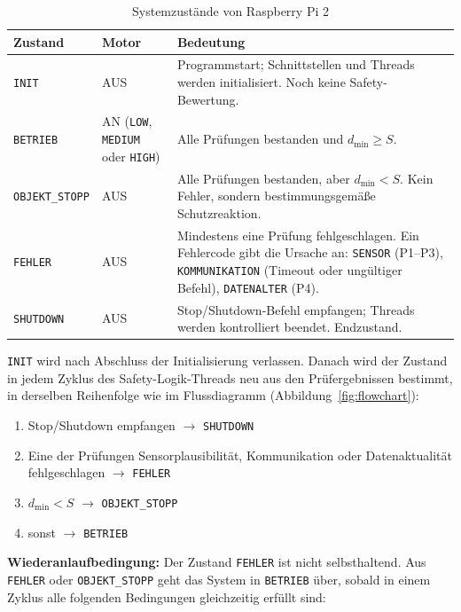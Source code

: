 \begin{table}[H]
    \centering
    \small
    \begin{tabularx}{\textwidth}{@{}p{2.7cm}p{2.2cm}Y@{}}
        \toprule
        \textbf{Zustand} & \textbf{Motor} & \textbf{Bedeutung} \\
        \midrule
        \texttt{INIT} & AUS & Programmstart; Schnittstellen und Threads werden initialisiert. Noch keine Safety-Bewertung. \\
        \texttt{BETRIEB} & AN (\texttt{LOW}, \texttt{MEDIUM} oder \texttt{HIGH}) & Alle Prüfungen bestanden und $d_{\min} \geq S$. \\
        \texttt{OBJEKT\_STOPP} & AUS & Alle Prüfungen bestanden, aber $d_{\min} < S$. Kein Fehler, sondern bestimmungsgemäße Schutzreaktion. \\
        \texttt{FEHLER} & AUS & Mindestens eine Prüfung fehlgeschlagen. Ein Fehlercode gibt die Ursache an: \texttt{SENSOR} (P1--P3), \texttt{KOMMUNIKATION} (Timeout oder ungültiger Befehl), \texttt{DATENALTER} (P4). \\
        \texttt{SHUTDOWN} & AUS & Stop/Shutdown-Befehl empfangen; Threads werden kontrolliert beendet. Endzustand. \\
        \bottomrule
    \end{tabularx}
    \caption{Systemzustände von Raspberry Pi 2}
\end{table}

\texttt{INIT} wird nach Abschluss der Initialisierung verlassen. Danach wird der
Zustand in jedem Zyklus des Safety-Logik-Threads neu aus den Prüfergebnissen
bestimmt, in derselben Reihenfolge wie im Flussdiagramm
(Abbildung~\ref{fig:flowchart}):

\begin{enumerate}
    \item Stop/Shutdown empfangen $\rightarrow$ \texttt{SHUTDOWN}
    \item Eine der Prüfungen Sensorplausibilität, Kommunikation oder Datenaktualität fehlgeschlagen $\rightarrow$ \texttt{FEHLER}
    \item $d_{\min} < S$ $\rightarrow$ \texttt{OBJEKT\_STOPP}
    \item sonst $\rightarrow$ \texttt{BETRIEB}
\end{enumerate}

\textbf{Wiederanlaufbedingung:} Der Zustand \texttt{FEHLER} ist nicht selbsthaltend. Aus
\texttt{FEHLER} oder \texttt{OBJEKT\_STOPP} geht das System in \texttt{BETRIEB}
über, sobald in einem Zyklus alle folgenden Bedingungen gleichzeitig erfüllt
sind:

